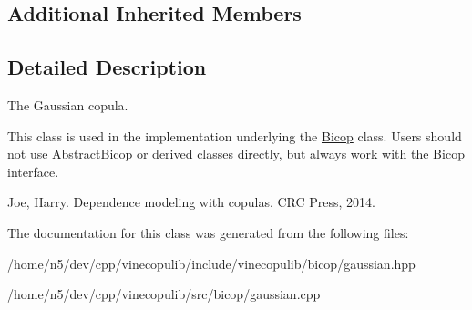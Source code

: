 \subsection*{Additional Inherited Members}


\subsection{Detailed Description}
The Gaussian copula. 

This class is used in the implementation underlying the \hyperlink{classvinecopulib_1_1_bicop}{Bicop} class. Users should not use \hyperlink{classvinecopulib_1_1_abstract_bicop}{Abstract\+Bicop} or derived classes directly, but always work with the \hyperlink{classvinecopulib_1_1_bicop}{Bicop} interface.

Joe, Harry. Dependence modeling with copulas. C\+RC Press, 2014. 

The documentation for this class was generated from the following files\+:\begin{DoxyCompactItemize}
\item 
/home/n5/dev/cpp/vinecopulib/include/vinecopulib/bicop/gaussian.\+hpp\item 
/home/n5/dev/cpp/vinecopulib/src/bicop/gaussian.\+cpp\end{DoxyCompactItemize}
